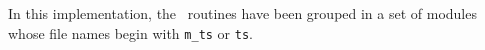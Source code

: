 In this implementation, the \tsiesta\ routines have been grouped in a
set of modules whose file names begin with \texttt{m\_ts} or
\texttt{ts}.
